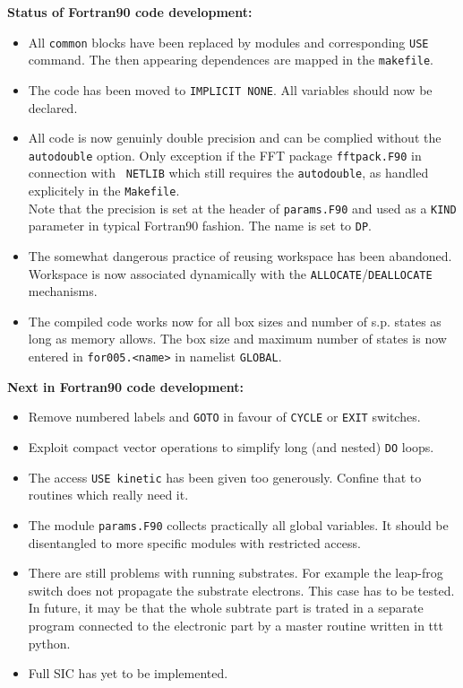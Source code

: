 \documentclass[12pt]{article}
\begin{document}
{\Large\bf Status of Fortran90 code development:}
\begin{itemize}
  \item 
    All {\tt common} blocks have been replaced by modules
    and corresponding {\tt USE} command. The then appearing
    dependences are mapped in the {\tt makefile}.
  \item The code has been moved to {\tt IMPLICIT NONE}. All variables should
    now be declared.
  \item
    All code is now genuinly double precision and can be
    complied without the {\tt autodouble} option. Only exception
    if the FFT package {\tt fftpack.F90} in connection with {\tt
      NETLIB}
    which still requires
    the  {\tt autodouble}, as handled explicitely in the
    {\tt Makefile}.
    \\
    Note that the precision is set at the header of {\tt params.F90}
    and used as a {\tt KIND} parameter in typical Fortran90 fashion.
    The name is set to {\tt DP}.
  \item
    The somewhat dangerous practice of reusing workspace has been
    abandoned. Workspace is now associated dynamically with
    the {\tt ALLOCATE}/{\tt DEALLOCATE} mechanisms.
  \item
    The compiled code works now for all box sizes and number of s.p.
    states as long as memory allows. The box size and maximum number
    of states is now entered in {\tt for005.<name>} in namelist
    {\tt GLOBAL}.
\end{itemize}

{\Large\bf Next in Fortran90 code development:}
\begin{itemize}
  \item Remove numbered labels and {\tt GOTO} in favour of
        {\tt CYCLE} or {\tt EXIT} switches.
  \item Exploit compact vector operations to simplify
        long (and nested) {\tt DO} loops.
  \item The access {\tt USE kinetic} has been given too generously.
        Confine that to routines which really need it.
  \item The module {\tt params.F90} collects practically all
        global variables. It should be disentangled to more
        specific modules with restricted access. 
  \item There are still problems with running substrates.
        For example the leap-frog switch does not propagate the
        substrate electrons.
        This case has to be tested.
        \\
        In future, it may be that the whole subtrate part
        is trated in a separate program connected to the electronic
        part by a master routine written in {ttt python}.
  \item Full SIC has yet to be implemented.
  \end{itemize}
\end{document}
